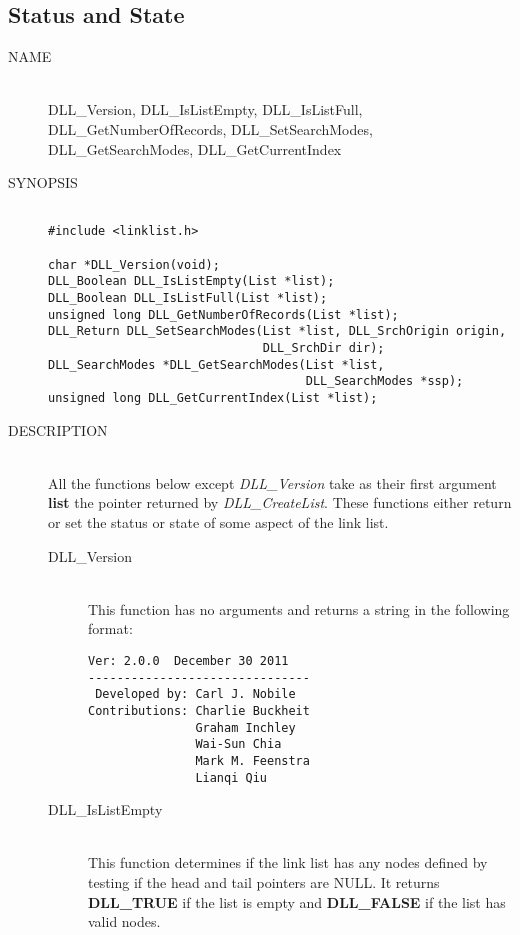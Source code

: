\documentclass[10pt,letterpaper,titlepage]{article}
\begin{document}
\subsection{Status and State}
\begin{description}
\item[NAME]\quad\\
DLL\_Version, DLL\_IsListEmpty, DLL\_IsListFull,\\
DLL\_GetNumberOfRecords, DLL\_SetSearchModes,\\
DLL\_GetSearchModes, DLL\_GetCurrentIndex

\item[SYNOPSIS]
\small
\begin{verbatim}

#include <linklist.h>

char *DLL_Version(void);
DLL_Boolean DLL_IsListEmpty(List *list);
DLL_Boolean DLL_IsListFull(List *list);
unsigned long DLL_GetNumberOfRecords(List *list);
DLL_Return DLL_SetSearchModes(List *list, DLL_SrchOrigin origin,
                              DLL_SrchDir dir);
DLL_SearchModes *DLL_GetSearchModes(List *list,
                                    DLL_SearchModes *ssp);
unsigned long DLL_GetCurrentIndex(List *list);
\end{verbatim}
\normalsize

\item[DESCRIPTION]\quad\\
All the functions below except \emph{DLL\_Version} take as their first argument \textbf{list} the pointer returned by \emph{DLL\_CreateList}.  These functions either return or set the status or state of some aspect of the link list.

\begin{description}
\item[DLL\_Version]\quad\\
 This function has no arguments and returns a string in the following format:
\begin{verbatim}
Ver: 2.0.0  December 30 2011
-------------------------------
 Developed by: Carl J. Nobile
Contributions: Charlie Buckheit
               Graham Inchley
               Wai-Sun Chia
               Mark M. Feenstra
               Lianqi Qiu
\end{verbatim}
\vspace{-16pt}
\item[DLL\_IsListEmpty]\quad\\
 This function determines if the link list has any nodes defined by testing if the head and tail pointers are NULL.  It returns \textbf{DLL\_TRUE} if the list is empty and \textbf{DLL\_FALSE} if the list has valid nodes.


\end{description}
\end{description}
\end{document}
